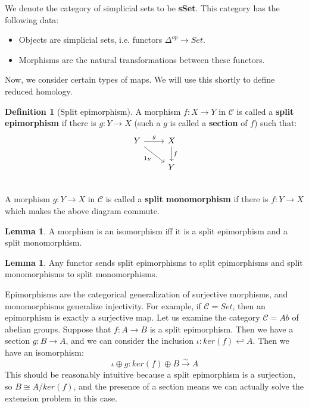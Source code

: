 \documentclass[11pt, oneside]{amsart}   	%
\theoremstyle{definition}
\newtheorem{definition}{Definition}[section]
\newtheorem{lemma}[theorem]{Lemma}
\begin{document}
We denote the category of simplicial sets to be \textbf{sSet}. This category has the following data:
\begin{itemize}
	\item Objects are simplicial sets, i.e. functors $\Delta^{op}\rightarrow Set$. 
	\item Morphisms are the natural transformations between these functors.
\end{itemize}

Now, we consider certain types of maps. We will use this shortly to define reduced homology.

\begin{definition}[Split epimorphism]
	A morphism $f : X\rightarrow Y$ in $\mathcal C$ is called a \textbf{split epimorphism} if there is $g : Y\rightarrow X$ 
	(such a $g$ is called a \textbf{section} of $f$) such that:
	\[\begin{tikzcd}
		Y\arrow[r, "g"]\arrow[dr, swap, "1_Y"] & X\arrow[d, "f"] \\ 
		& Y\\
	\end{tikzcd}\]
	A morphism $g : Y\rightarrow X$ in $\mathcal C$ is called a \textbf{split monomorphism} if there is $f : Y\rightarrow X$ 
	which makes the above diagram commute.
\end{definition}

\begin{lemma}
	A morphism is an isomorphism iff it is a split epimorphism and a split monomorphism.
\end{lemma}

\begin{lemma}
	Any functor sends split epimorphisms to split epimorphisms and split monomorphisms to split monomorphisms.
\end{lemma}
Epimorphisms are the categorical generalization of surjective morphisms, and monomorphisms generalize injectivity. For 
example, if $\mathcal C = Set$, then an epimorphism is exactly a surjective map. Let us examine the category $\mathcal 
C = Ab$ of abelian groups. Suppose that $f : A\rightarrow B$ is a split epimorphism. Then we have a section $g : B\rightarrow 
A$, and we can consider the inclusion $\iota : ker(f)\hookleftarrow A$. Then we have an isomorphism:
\begin{equation}
	\iota\oplus g : ker(f)\oplus B\xrightarrow{\sim} A
\end{equation}
This should be reasonably intuitive because a split epimorphism is a surjection, so $B\cong A / ker(f)$, and  
the presence of a section means we can actually solve the extension problem in this case. 
\end{document}
